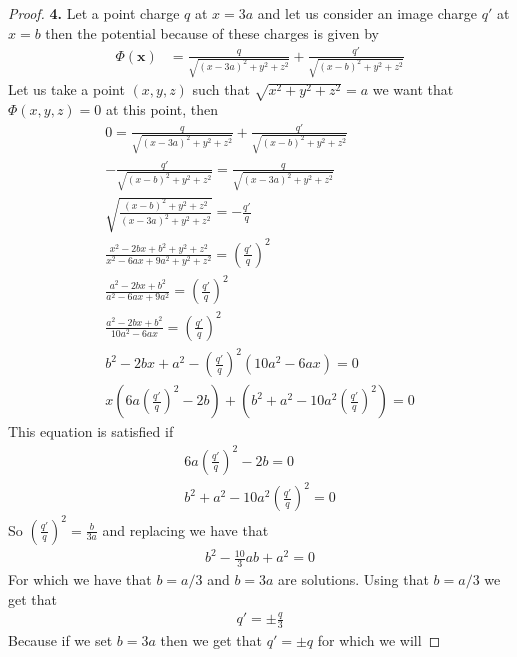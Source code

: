 \documentclass[11pt]{article}
\theoremstyle{definition}
\begin{document}
\cleardoublepage
\begin{proof}{\textbf{4.}}
    Let a point charge $q$ at $x=3a$ and let us consider an image charge $q'$
    at $x = b$ then the potential because of these charges is given by
    \begin{align*}
        \Phi(\bm{x}) &= \frac{q}{\sqrt{(x-3a)^2 + y^2 + z^2}}
        + \frac{q'}{\sqrt{(x-b)^2 + y^2 + z^2}}
    \end{align*}
    Let us take a point $(x,y,z)$ such that $\sqrt{x^2 + y^2 + z^2} = a$ we
    want that $\Phi(x,y,z) = 0$ at this point, then
    \begin{align*}
        0 = \frac{q}{\sqrt{(x-3a)^2 + y^2 + z^2}}
        + \frac{q'}{\sqrt{(x-b)^2 + y^2 + z^2}}\\
        -\frac{q'}{\sqrt{(x-b)^2 + y^2 + z^2}}
        = \frac{q}{\sqrt{(x-3a)^2 + y^2 + z^2}}\\
        \sqrt{\frac{(x-b)^2 + y^2 + z^2}{(x-3a)^2 + y^2 + z^2}}
        = -\frac{q'}{q}\\
        \frac{x^2 - 2bx + b^2 + y^2 + z^2}{x^2 -6ax + 9a^2 + y^2 + z^2}
        = \left(\frac{q'}{q}\right)^2\\
        \frac{a^2 - 2bx + b^2}{a^2 -6ax + 9a^2}
        = \left(\frac{q'}{q}\right)^2\\
        \frac{a^2 - 2bx + b^2}{10a^2 -6ax}
        = \left(\frac{q'}{q}\right)^2\\
        b^2 - 2bx + a^2 - \left(\frac{q'}{q}\right)^2(10a^2 -6ax) = 0\\
        x\left(6a\left(\frac{q'}{q}\right)^2 - 2b\right)
        + \left(b^2  + a^2 - 10a^2\left(\frac{q'}{q}\right)^2\right) = 0
    \end{align*}
    This equation is satisfied if 
    \begin{align*}
        6a\left(\frac{q'}{q}\right)^2 - 2b = 0\\
        b^2  + a^2 - 10a^2\left(\frac{q'}{q}\right)^2 = 0
    \end{align*}
    So $\left(\frac{q'}{q}\right)^2 = \frac{b}{3a}$ and replacing we have that
    \begin{align*}
        b^2 - \frac{10}{3}ab + a^2 = 0
    \end{align*}
    For which we have that $b = a/3$ and $b = 3a$ are solutions.
    Using that $b = a/3$ we get that 
    \begin{align*}
        q' = \pm\frac{q}{3}
    \end{align*}
    Because if we set $b = 3a$ then we get that $q' = \pm q$ for which we will

\end{proof}
\end{document}
